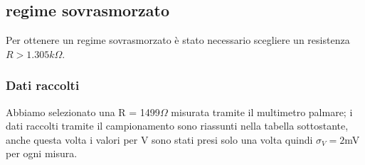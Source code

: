 \documentclass[a4paper]{article}
\theoremstyle{definition}
\begin{document}
\pagebreak
\subsection{regime sovrasmorzato}

Per ottenere un regime sovrasmorzato è stato necessario scegliere un resistenza \(R > 1.305 k \Omega\). 

\subsubsection*{Dati raccolti}
Abbiamo selezionato una R = 1499\(\Omega\) misurata tramite il multimetro palmare; i dati raccolti tramite il campionamento sono riassunti nella tabella sottostante, anche questa volta i valori per V sono stati presi solo una volta quindi \(\sigma_{V} = 2\)mV per ogni misura.
\end{document}

